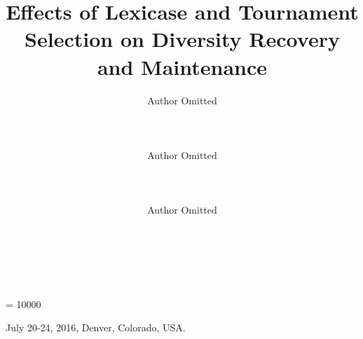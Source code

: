 \documentclass{sig-alternate-05-2015}
\begin{document}

\widowpenalty = 10000


 {July 20-24, 2016, Denver, Colorado, USA.}


%



\title{Effects of Lexicase and Tournament Selection on Diversity Recovery and Maintenance}

%
%
%
%
%

%
\author{
\alignauthor
Author Omitted\\
       \\
       \\
       \\
\alignauthor
Author Omitted\\
       \\
       \\
       \\
\alignauthor
Author Omitted\\
       \\
       \\
       \\
}
\end{document}
